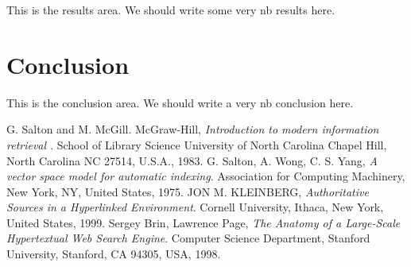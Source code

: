 \documentclass[lettersize,journal,12pt]{IEEEtran}
\begin{document}
This is the results area. We should write some very nb results here.

\section{Conclusion}

This is the conclusion area. We should write a very nb conclusion here.



\begin{thebibliography}{1}

	G. Salton and M. McGill. McGraw-Hill, {\it{Introduction to modern information retrieval }}. School of Library Science University of North Carolina Chapel Hill, North Carolina NC 27514, U.S.A., 1983. 
    G. Salton, A. Wong, C. S. Yang, {\it{A vector space model for automatic indexing}}. Association for Computing Machinery, New York, NY, United States, 1975.
	JON M. KLEINBERG, {\it{Authoritative Sources in a Hyperlinked Environment}}. Cornell University, Ithaca, New York, United States, 1999.
	Sergey Brin, Lawrence Page, {\it{The Anatomy of a Large-Scale Hypertextual Web
	Search Engine}}. Computer Science Department, Stanford University, Stanford, CA 94305, USA, 1998.


\end{thebibliography}
\end{document}
